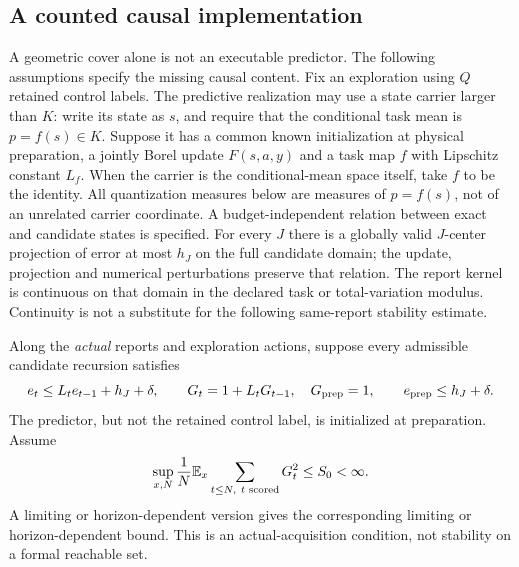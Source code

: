 \subsection{A counted causal implementation}
A geometric cover alone is not an executable predictor. The following assumptions specify the missing causal content. Fix an exploration using $Q$ retained control labels. The predictive realization may use a state carrier larger than $K$: write its state as $s$, and require that the conditional task mean is $p=f(s)\in K$. Suppose it has a common known initialization at physical preparation, a jointly Borel update $F(s,a,y)$ and a task map $f$ with Lipschitz constant $L_f$. When the carrier is the conditional-mean space itself, take $f$ to be the identity. All quantization measures below are measures of $p=f(s)$, not of an unrelated carrier coordinate. A budget-independent relation between exact and candidate states is specified. For every $J$ there is a globally valid $J$-center projection of error at most $h_J$ on the full candidate domain; the update, projection and numerical perturbations preserve that relation. The report kernel is continuous on that domain in the declared task or total-variation modulus. Continuity is not a substitute for the following same-report stability estimate.

Along the \emph{actual} reports and exploration actions, suppose every admissible candidate recursion satisfies
\begin{equation}\label{eq:gain-recursion}
 e_t\le L_t e_{t-1}+h_J+\delta,
 \qquad
 G_t=1+L_tG_{t-1},\quad G_{\rm prep}=1,
 \qquad e_{\rm prep}\le h_J+\delta.
\end{equation}
The predictor, but not the retained control label, is initialized at preparation. Assume
\begin{equation}\label{eq:occupied-stability}
 \sup_{x,N}\frac1N\mathbb E_x\sum_{t\le N,\ t\text{ scored}}G_t^2\le S_0<\infty.
\end{equation}
A limiting or horizon-dependent version gives the corresponding limiting or horizon-dependent bound. This is an actual-acquisition condition, not stability on a formal reachable set.

